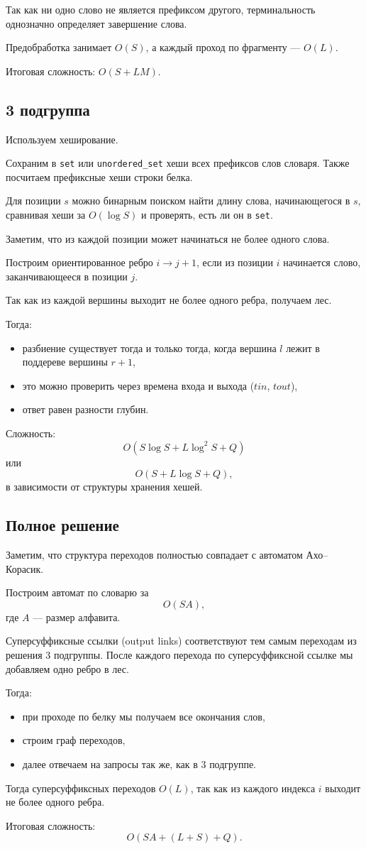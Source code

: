 Так как ни одно слово не является префиксом другого, терминальность однозначно определяет завершение слова.

Предобработка занимает $O(S)$, а каждый проход по фрагменту --- $O(L)$.

Итоговая сложность: $O(S + LM)$.

\subsection*{3 подгруппа}

Используем хеширование.

Сохраним в \texttt{set} или \texttt{unordered\_set} хеши всех префиксов слов словаря. Также посчитаем префиксные хеши строки белка.

Для позиции $s$ можно бинарным поиском найти длину слова, начинающегося в $s$, сравнивая хеши за $O(\log S)$ и проверять, есть ли он в \texttt{set}.

Заметим, что из каждой позиции может начинаться не более одного слова.

Построим ориентированное ребро $i \to j+1$, если из позиции $i$ начинается слово, заканчивающееся в позиции $j$.

Так как из каждой вершины выходит не более одного ребра, получаем лес.

Тогда:
\begin{itemize}
    \item разбиение существует тогда и только тогда, когда вершина $l$ лежит в поддереве вершины $r+1$,
    \item это можно проверить через времена входа и выхода ($tin$, $tout$),
    \item ответ равен разности глубин.
\end{itemize}

Сложность:
\[
O(S \log S + L \log^2 S + Q)
\]
или
\[
O(S + L \log S + Q),
\]
в зависимости от структуры хранения хешей.


\subsection*{Полное решение}

Заметим, что структура переходов полностью совпадает с автоматом Ахо--Корасик.

Построим автомат по словарю за
\[
O(SA),
\]
где $A$ --- размер алфавита.

Суперсуффиксные ссылки (output links) соответствуют тем самым переходам из решения 3 подгруппы.
После каждого перехода по суперсуффиксной ссылке мы добавляем одно ребро в лес.

Тогда:
\begin{itemize}
    \item при проходе по белку мы получаем все окончания слов,
    \item строим граф переходов,
    \item далее отвечаем на запросы так же, как в 3 подгруппе.
\end{itemize}
Тогда суперсуффиксных переходов $O(L)$, так как из каждого индекса $i$ выходит не более одного ребра.

Итоговая сложность:
\[
O(SA + (L + S) + Q).
\]

